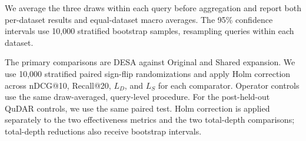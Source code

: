 \label{statistical-analysis}

We average the three draws within each query before aggregation and report both per-dataset results and equal-dataset macro averages. The 95\% confidence intervals use 10,000 stratified bootstrap samples, resampling queries within each dataset.

The primary comparisons are DESA against Original and Shared expansion. We use 10,000 stratified paired sign-flip randomizations and apply Holm correction across nDCG@10, Recall@20, \(L_D\), and \(L_S\) for each comparator. Operator controls use the same draw-averaged, query-level procedure. For the post-held-out QuDAR controls, we use the same paired test. Holm correction is applied separately to the two effectiveness metrics and the two total-depth comparisons; total-depth reductions also receive bootstrap intervals.
